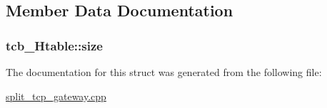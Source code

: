 \subsection{\-Member \-Data \-Documentation}
\hypertarget{structtcb__Htable_aa595196bfa036da3302b5b84e37e16d3}{
\subsubsection[{size}]{ {\bf tcb\-\_\-\-Htable\-::size}}}\label{structtcb__Htable_aa595196bfa036da3302b5b84e37e16d3}


\-The documentation for this struct was generated from the following file\-:\begin{DoxyCompactItemize}
\item 
\hyperlink{split__tcp__gateway_8cpp}{split\-\_\-tcp\-\_\-gateway.\-cpp}\end{DoxyCompactItemize}

